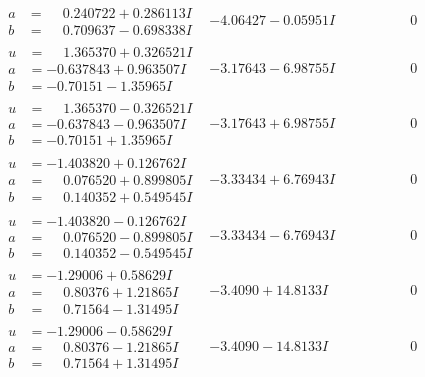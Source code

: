\documentclass[1p]{elsarticle_modified}
\theoremstyle{definition}
\begin{document}
$$\begin{array}{c|c|c}
\begin{aligned}
a &= \phantom{-}0.240722 + 0.286113 I \\
b &= \phantom{-}0.709637 - 0.698338 I\end{aligned}
 & -4.06427 - 0.05951 I & \phantom{-0.000000 } 0 \\ \hline\begin{aligned}
u &= \phantom{-}1.365370 + 0.326521 I \\
a &= -0.637843 + 0.963507 I \\
b &= -0.70151 - 1.35965 I\end{aligned}
 & -3.17643 - 6.98755 I & \phantom{-0.000000 } 0 \\ \hline\begin{aligned}
u &= \phantom{-}1.365370 - 0.326521 I \\
a &= -0.637843 - 0.963507 I \\
b &= -0.70151 + 1.35965 I\end{aligned}
 & -3.17643 + 6.98755 I & \phantom{-0.000000 } 0 \\ \hline\begin{aligned}
u &= -1.403820 + 0.126762 I \\
a &= \phantom{-}0.076520 + 0.899805 I \\
b &= \phantom{-}0.140352 + 0.549545 I\end{aligned}
 & -3.33434 + 6.76943 I & \phantom{-0.000000 } 0 \\ \hline\begin{aligned}
u &= -1.403820 - 0.126762 I \\
a &= \phantom{-}0.076520 - 0.899805 I \\
b &= \phantom{-}0.140352 - 0.549545 I\end{aligned}
 & -3.33434 - 6.76943 I & \phantom{-0.000000 } 0 \\ \hline\begin{aligned}
u &= -1.29006 + 0.58629 I \\
a &= \phantom{-}0.80376 + 1.21865 I \\
b &= \phantom{-}0.71564 - 1.31495 I\end{aligned}
 & -3.4090 + 14.8133 I & \phantom{-0.000000 } 0 \\ \hline\begin{aligned}
u &= -1.29006 - 0.58629 I \\
a &= \phantom{-}0.80376 - 1.21865 I \\
b &= \phantom{-}0.71564 + 1.31495 I\end{aligned}
 & -3.4090 - 14.8133 I & \phantom{-0.000000 } 0 \\ \hline\begin{aligned}

\end{aligned}
\end{array}$$
\end{document}
